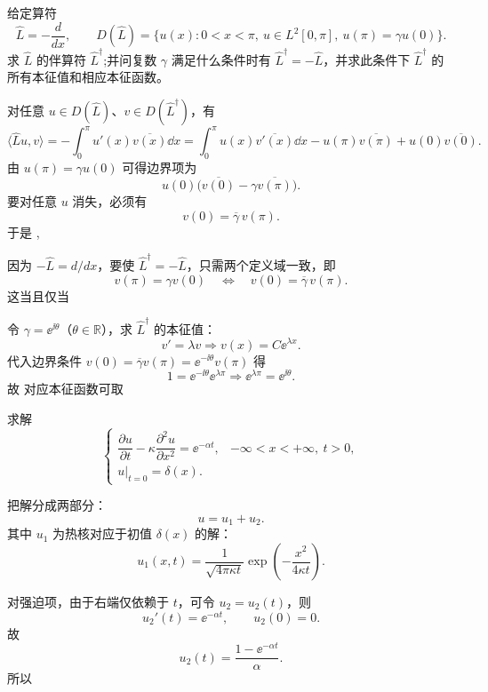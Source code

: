 ﻿

\begin{question}[伴算符与斜自伴]

给定算符
\[
\hat L=-\frac{d}{dx},
\qquad
D(\hat L)=\{u(x):0<x<\pi,\ u\in L^2[0,\pi],\ u(\pi)=\gamma u(0)\}.
\]
求 $\hat L$ 的伴算符 $\hat L^\dagger$;并问复数 $\gamma$ 满足什么条件时有 $\hat L^\dagger=-\hat L$，并求此条件下 $\hat L^\dagger$ 的所有本征值和相应本征函数。

\begin{solution}

对任意 $u\in D(\hat L)$、$v\in D(\hat L^\dagger)$，有
\[
\langle \hat Lu,v\rangle
=-\int_0^{\pi}u'(x)\overline{v(x)}\dd{x}
=\int_0^{\pi}u(x)\overline{v'(x)}\dd{x}-u(\pi)\overline{v(\pi)}+u(0)\overline{v(0)}.
\]
由 $u(\pi)=\gamma u(0)$ 可得边界项为
\[
 u(0)\bigl(\overline{v(0)}-\gamma\overline{v(\pi)}\bigr).
\]
要对任意 $u$ 消失，必须有
\[
 v(0)=\overline{\gamma}\,v(\pi).
\]
于是
,
\qquad
{}

因为 $-\hat L=d/dx$，要使 $\hat L^\dagger=-\hat L$，只需两个定义域一致，即
\[
 v(\pi)=\gamma v(0)
\quad\Longleftrightarrow\quad
 v(0)=\overline\gamma\,v(\pi).
\]
这当且仅当

令 $\gamma=\ee^{\ii\theta}$（$\theta\in\mathbb R$），求 $\hat L^\dagger$ 的本征值：
\[
  v'=\lambda v
 \Longrightarrow v(x)=C\ee^{\lambda x}.
\]
代入边界条件 $v(0)=\overline\gamma v(\pi)=\ee^{-\ii\theta}v(\pi)$ 得
\[
 1=\ee^{-\ii\theta}\ee^{\lambda\pi}
 \Longrightarrow
  \ee^{\lambda\pi}=\ee^{\ii\theta}.
\]
故
对应本征函数可取

\end{solution}
\end{question}

\begin{question}[一维无限长杆上的热传导]

求解
\[
\begin{cases}
\dfrac{\partial u}{\partial t}-\kappa\dfrac{\partial^2u}{\partial x^2}=\ee^{-\alpha t},
&-\infty<x<+\infty,\ t>0,\\
u|_{t=0}=\delta(x).
\end{cases}
\]

\begin{solution}

把解分成两部分：
\[
 u=u_1+u_2.
\]
其中 $u_1$ 为热核对应于初值 $\delta(x)$ 的解：
\[
 u_1(x,t)=\frac{1}{\sqrt{4\pi\kappa t}}\exp\!\left(-\frac{x^2}{4\kappa t}\right).
\]

对强迫项，由于右端仅依赖于 $t$，可令 $u_2=u_2(t)$，则
\[
 u_2'(t)=\ee^{-\alpha t},\qquad u_2(0)=0.
\]
故
\[
 u_2(t)=\frac{1-\ee^{-\alpha t}}{\alpha}.
\]
所以

\end{solution}
\end{question}

